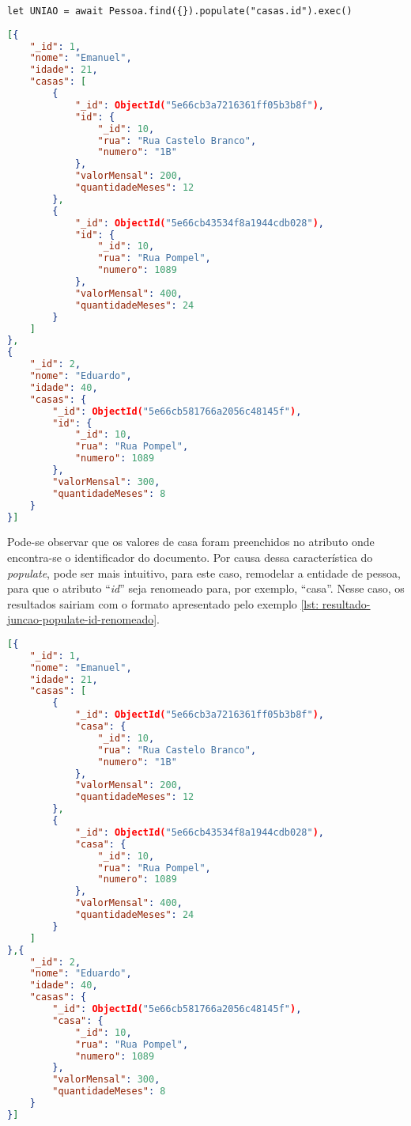\begin{lstlisting}[style=ES6, caption={Junção de Documentos Com o \textit{Populate}\label{lst: juncao-populate}}]
  let UNIAO = await Pessoa.find({}).populate("casas.id").exec()
\end{lstlisting}

\begin{lstlisting}[language=json, caption={Resultado da Junção de Documentos Com o \textit{Populate}\label{lst: resultado-juncao-populate}}]
[{
    "_id": 1,
    "nome": "Emanuel",
    "idade": 21,
    "casas": [
        {
            "_id": ObjectId("5e66cb3a7216361ff05b3b8f"),
            "id": {
                "_id": 10,
                "rua": "Rua Castelo Branco",
                "numero": "1B"
            },
            "valorMensal": 200,
            "quantidadeMeses": 12
        },
        {
            "_id": ObjectId("5e66cb43534f8a1944cdb028"),
            "id": {
                "_id": 10,
                "rua": "Rua Pompel",
                "numero": 1089
            },
            "valorMensal": 400,
            "quantidadeMeses": 24
        }
    ]
},
{
    "_id": 2,
    "nome": "Eduardo",
    "idade": 40,
    "casas": {
        "_id": ObjectId("5e66cb581766a2056c48145f"),
        "id": {
            "_id": 10,
            "rua": "Rua Pompel",
            "numero": 1089
        },
        "valorMensal": 300,
        "quantidadeMeses": 8
    }
}]
\end{lstlisting}

Pode-se observar que os valores de casa foram preenchidos no atributo onde encontra-se o identificador do documento. Por causa dessa característica do \textit{populate}, pode ser mais intuitivo, para este caso, remodelar a entidade de pessoa, para que o atributo ``\textit{id}'' seja renomeado para, por exemplo, ``casa''. Nesse caso, os resultados sairiam com o formato apresentado pelo exemplo \ref{lst: resultado-juncao-populate-id-renomeado}.

\begin{lstlisting}[language=json, caption={Resultado do \textit{Populate} com ``id'' Renomeado para ``casa''\label{lst: resultado-juncao-populate-id-renomeado}}]
[{
    "_id": 1,
    "nome": "Emanuel",
    "idade": 21,
    "casas": [
        {
            "_id": ObjectId("5e66cb3a7216361ff05b3b8f"),
            "casa": {
                "_id": 10,
                "rua": "Rua Castelo Branco",
                "numero": "1B"
            },
            "valorMensal": 200,
            "quantidadeMeses": 12
        },
        {
            "_id": ObjectId("5e66cb43534f8a1944cdb028"),
            "casa": {
                "_id": 10,
                "rua": "Rua Pompel",
                "numero": 1089
            },
            "valorMensal": 400,
            "quantidadeMeses": 24
        }
    ]
},{
    "_id": 2,
    "nome": "Eduardo",
    "idade": 40,
    "casas": {
        "_id": ObjectId("5e66cb581766a2056c48145f"),
        "casa": {
            "_id": 10,
            "rua": "Rua Pompel",
            "numero": 1089
        },
        "valorMensal": 300,
        "quantidadeMeses": 8
    }
}]
\end{lstlisting}

